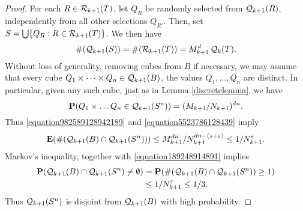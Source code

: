 \begin{proof}
    For each $R \in \operatorname{\mathcal{R}}_{k+1}(T)$, let $Q_R$ be randomly selected from $\operatorname{\mathcal{Q}}_{k+1}(R)$, independently from all other selections $Q_{R'}$. Then, set $S = \bigcup \{ Q_R: R \in \operatorname{\mathcal{R}}_{k+1}(T) \}$. We then have
    \[ \#(\operatorname{\mathcal{Q}}_{k+1}(S)) = \#(\operatorname{\mathcal{R}}_{k+1}(T)) = M_{k+1}^d \operatorname{\mathcal{Q}}_k(T). \]
    Without loss of generality, removing cubes from $B$ if necessary, we may assume that every cube $Q_1 \times \dots \times Q_n \in \operatorname{\mathcal{Q}}_{k+1}(B)$, the values $Q_1, \dots, Q_n$ are distinct. In particular, given any such cube, just as in Lemma \ref{discretelemma}, we have
    \[ \mathbf{P}(Q_1 \times \dots Q_n \in \operatorname{\mathcal{Q}}_{k+1}(S^n)) = (M_{k+1}/N_{k+1})^{dn}. \]
    Thus \eqref{equation982589128942189} and \eqref{equation5523786128439} imply
    \[ \mathbf{E}(\#(\operatorname{\mathcal{Q}}_{k+1}(B) \cap \operatorname{\mathcal{Q}}_{k+1}(S^n))) \leq M_{k+1}^{dn}/N_{k+1}^{dn - (s + \varepsilon)} \leq 1/N_{k+1}^\varepsilon. \]
    Markov's inequality, together with \eqref{equation189248914891} implies
    \begin{equation} \label{fourierdim2}
    \begin{split}
        \mathbf{P}(\operatorname{\mathcal{Q}}_{k+1}(B) \cap \operatorname{\mathcal{Q}}_{k+1}(S^n) \neq \emptyset) &= \mathbf{P}(\# (\operatorname{\mathcal{Q}}_{k+1}(B) \cap \operatorname{\mathcal{Q}}_{k+1}(S^n)) \geq 1)\\
        &\leq 1/N_{k+1}^\varepsilon \leq 1/3.
    \end{split}
    \end{equation}
    Thus $\operatorname{\mathcal{Q}}_{k+1}(S^n)$ is disjoint from $\operatorname{\mathcal{Q}}_{k+1}(B)$ with high probability.


\end{proof}
